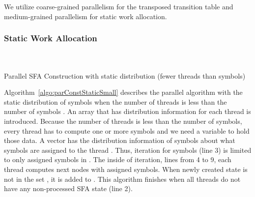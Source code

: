 \documentclass[10pt, conference, compsocconf]{IEEEtran}
\begin{document}
We utilize coarse-grained parallelism for the transposed transition table and medium-grained parallelism for static work allocation.

\subsubsection{Static Work Allocation}
\label{subsubsec:Static}
\begin{algorithm}[htp]
    \\
    \\
    
    \caption{Parallel SFA Construction with static distribution (fewer threads than symbols)}
    \label{algo:parConstStaticSmall}
\end{algorithm}

Algorithm~\ref{algo:parConstStaticSmall} describes the parallel algorithm
with the static distribution of symbols when the number of threads  is
less than the number of symbols . An array that has distribution information for each thread is introduced.
Because the number of threads is less than the number of symbols, every thread
has to compute one or more symbols and we need a variable
to hold those data. A vector 
has the distribution information of symbols  about what symbols are assigned
to the thread . Thus, iteration for symbols (line 3) is limited to only
assigned symbols in . The inside of iteration, lines from 4 to 9, each thread computes next nodes with assigned symbols. When newly created
state  is not in the set , it is added to .
This algorithm finishes when all threads do not have any non-processed SFA state (line 2).
\end{document}
